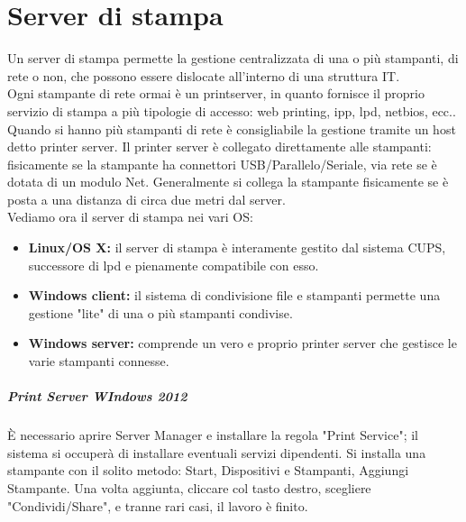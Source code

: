 \documentclass[a4paper]{report}
\begin{document}
\chapter{Server di stampa}
Un server di stampa permette la gestione centralizzata di una o più stampanti, di rete o non, che possono essere dislocate all'interno di una struttura IT.\\
Ogni stampante di rete ormai è un printserver, in quanto fornisce il proprio servizio di stampa a più tipologie di accesso: web printing, ipp, lpd, netbios, ecc..\\
Quando si hanno più stampanti di rete è consigliabile la gestione tramite un host detto printer server. Il printer server è collegato direttamente alle stampanti: fisicamente se la stampante ha connettori USB/Parallelo/Seriale, via rete se è dotata di un modulo Net. Generalmente si collega la stampante fisicamente se è posta a una distanza di circa due metri dal server.\\
Vediamo ora il server di stampa nei vari OS:
\begin{itemize}
\item \textbf{Linux/OS X:} il server di stampa è interamente gestito dal sistema CUPS, successore di lpd e pienamente compatibile con esso.
\item \textbf{Windows client:} il sistema di condivisione file e stampanti permette una gestione "lite" di una o più stampanti condivise.
\item \textbf{Windows server:} comprende un vero e proprio printer server che gestisce le varie stampanti connesse.
\end{itemize}
\paragraph{Print Server WIndows 2012} È necessario aprire Server Manager e installare la regola "Print Service"; il sistema si occuperà di installare eventuali servizi dipendenti. Si installa una stampante con il solito metodo: Start, Dispositivi e Stampanti, Aggiungi Stampante. Una volta aggiunta, cliccare col tasto destro, scegliere "Condividi/Share", e tranne rari casi, il lavoro è finito.\\
\end{document}
